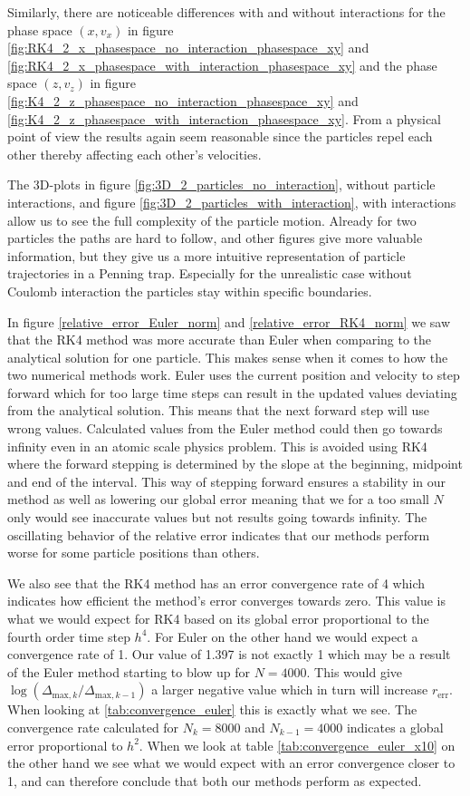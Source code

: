 \documentclass[english,notitlepage,reprint,nofootinbib]{revtex4-1}  %
\begin{document}
Similarly, there are noticeable differences with and without interactions for the phase space $(x, v_x)$ in figure \ref{fig:RK4_2_x_phasespace_no_interaction_phasespace_xy}
and \ref{fig:RK4_2_x_phasespace_with_interaction_phasespace_xy} and the phase space $(z, v_z)$ in figure \ref{fig:K4_2_z_phasespace_no_interaction_phasespace_xy}
and \ref{fig:K4_2_z_phasespace_with_interaction_phasespace_xy}. From a physical point of view the results again seem reasonable since the particles
repel each other thereby affecting each other's velocities.

The 3D-plots in figure \ref{fig:3D_2_particles_no_interaction}, without
particle interactions, and figure \ref{fig:3D_2_particles_with_interaction}, with interactions allow us to see the full complexity of the particle motion.
Already for two particles the paths are hard to follow, and other figures give more valuable information, but they give us a more intuitive representation of particle trajectories in a Penning trap. Especially for the unrealistic case without Coulomb interaction the particles stay within specific boundaries.

In figure \ref{relative_error_Euler_norm} and \ref{relative_error_RK4_norm} we saw that the RK4 method was more accurate than Euler when comparing to the analytical solution for one particle. This makes sense when it comes to how the two numerical methods work. Euler uses the current position and velocity to step forward which for too large time steps can result in the updated values deviating from the analytical solution. This means that the next forward step will use wrong values. Calculated values from the Euler method could then go towards infinity even in an atomic scale physics problem. This is avoided using RK4 where the forward stepping is determined by the slope at the beginning, midpoint and end of the interval. This way of stepping forward ensures a stability in our method as well as lowering our global error meaning that we for a too small $N$ only would see inaccurate values but not results going towards infinity. The oscillating behavior of the relative error indicates that our methods perform worse for some particle positions than others.

We also see that the RK4 method has an error convergence rate of 4 which indicates how efficient the method's error converges towards zero. This value is what we would expect for RK4 based on its global error proportional to the fourth order time step $h^4$. For Euler on the other hand we would expect a convergence rate of 1. Our value of 1.397 is not exactly 1 which may be a result of the Euler method starting to blow up for $N=4000$. This would give $\log(\Delta_{\text{max},k}/\Delta_{\text{max},k-1})$ a larger negative value which in turn will increase $r_{\text{err}}$. When looking at \ref{tab:convergence_euler} this is exactly what we see. The convergence rate calculated for $N_k = 8000$ and $N_{k-1} = 4000$ indicates a global error proportional to $h^2$. When we look at table \ref{tab:convergence_euler_x10} on the other hand we see what we would expect with an error convergence closer to 1, and can therefore conclude that both our methods perform as expected.
\end{document}

